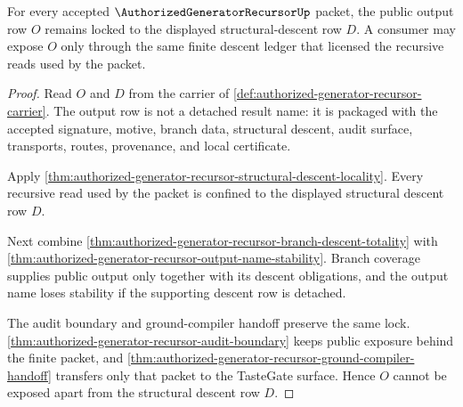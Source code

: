 \begin{theorem}
\label{thm:authorized-generator-recursor-descent-output-lock}
For every accepted $\AuthorizedGeneratorRecursorUp$ packet, the public output
row $O$ remains locked to the displayed structural-descent row $D$. A consumer
may expose $O$ only through the same finite descent ledger that licensed the
recursive reads used by the packet.
\end{theorem}
\begin{proof}
Read $O$ and $D$ from the carrier of
\autoref{def:authorized-generator-recursor-carrier}. The output row is not a
detached result name: it is packaged with the accepted signature, motive,
branch data, structural descent, audit surface, transports, routes,
provenance, and local certificate.

Apply
\autoref{thm:authorized-generator-recursor-structural-descent-locality}. Every
recursive read used by the packet is confined to the displayed structural
descent row $D$.

Next combine
\autoref{thm:authorized-generator-recursor-branch-descent-totality} with
\autoref{thm:authorized-generator-recursor-output-name-stability}. Branch
coverage supplies public output only together with its descent obligations,
and the output name loses stability if the supporting descent row is detached.

The audit boundary and ground-compiler handoff preserve the same lock.
\autoref{thm:authorized-generator-recursor-audit-boundary} keeps public
exposure behind the finite packet, and
\autoref{thm:authorized-generator-recursor-ground-compiler-handoff} transfers
only that packet to the TasteGate surface. Hence $O$ cannot be exposed apart
from the structural descent row $D$.
\end{proof}

